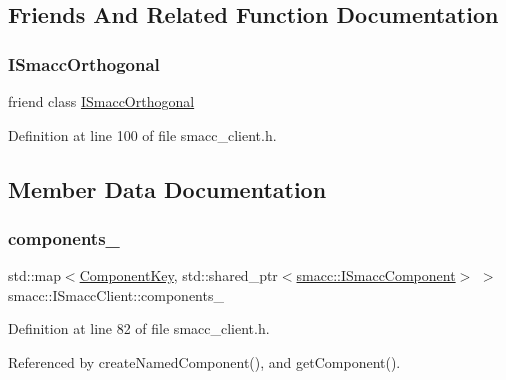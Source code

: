 \subsection{Friends And Related Function Documentation}
\mbox{\label{classsmacc_1_1ISmaccClient_a7205cc84a71fea903124d54d01e99a68}} 
\subsubsection{\texorpdfstring{I\+Smacc\+Orthogonal}{ISmaccOrthogonal}}
{\footnotesize\ttfamily friend class \hyperlink{classsmacc_1_1ISmaccOrthogonal}{I\+Smacc\+Orthogonal}\hspace{0.3cm}{\ttfamily [friend]}}



Definition at line 100 of file smacc\+\_\+client.\+h.



\subsection{Member Data Documentation}
\mbox{\label{classsmacc_1_1ISmaccClient_a9e670e9071bb549dbeb08985d0114afe}} 
\subsubsection{\texorpdfstring{components\+\_\+}{components\_}}
{\footnotesize\ttfamily std\+::map$<$\hyperlink{structsmacc_1_1ComponentKey}{Component\+Key}, std\+::shared\+\_\+ptr$<$\hyperlink{classsmacc_1_1ISmaccComponent}{smacc\+::\+I\+Smacc\+Component}$>$ $>$ smacc\+::\+I\+Smacc\+Client\+::components\+\_\+\hspace{0.3cm}{\ttfamily [protected]}}



Definition at line 82 of file smacc\+\_\+client.\+h.



Referenced by create\+Named\+Component(), and get\+Component().

